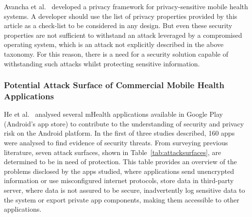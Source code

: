 Avancha et al.~\cite{avancha2012privacy} developed a privacy framework for privacy-sensitive mobile health systems. A developer should use the list of privacy properties provided by this article as a check-list to be considered in any design. But even these security properties are not sufficient to withstand an attack leveraged by a compromised operating system, which is an attack not explicitly described in the above taxonomy. For this reason, there is a need for a security solution capable of withstanding such attacks whilst protecting sensitive information.
 
\subsubsection{Potential Attack Surface of Commercial Mobile Health Applications}

He et al.~\cite{he2014security} analysed several mHealth applications available in Google Play (Android's app store) to contribute to the understanding of security and privacy risk on the Android platform. In the first of three studies described, 160 apps were analysed to find evidence of security threats. From surveying previous literature, seven attack surfaces, shown in Table~\ref{tab:attacksurfaces}, are determined to be in need of protection. This table provides an overview of the problems disclosed by the apps studied, where applications send unencrypted information or use misconfigured internet protocols, store data in third-party server, where data is not assured to be secure, inadvertently log sensitive data to the system or export private app components, making them accessible to other applications.

